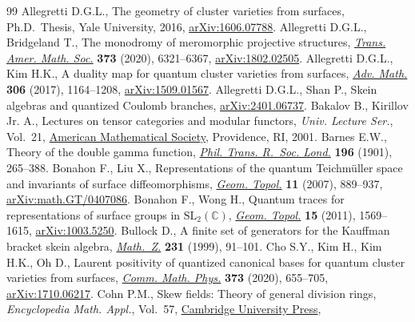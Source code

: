\documentclass[pdftex]{sigma}
\numberwithin{equation}{section}
\theoremstyle{definition}
\begin{document}
\begin{thebibliography}{99}
\footnotesize\itemsep=0pt
Allegretti D.G.L., The geometry of cluster varieties from surfaces, Ph.D.~Thesis, {Y}ale University, 2016,
 \href{http://arxiv.org/abs/1606.07788}{arXiv:1606.07788}.
Allegretti D.G.L., Bridgeland T., The monodromy of meromorphic projective
 structures, \href{https://doi.org/10.1090/tran/8093}{\textit{Trans. Amer.
 Math. Soc.}} \textbf{373} (2020), 6321--6367,
 \href{http://arxiv.org/abs/1802.02505}{arXiv:1802.02505}.
Allegretti D.G.L., Kim H.K., A duality map for quantum cluster varieties from
 surfaces, \href{https://doi.org/10.1016/j.aim.2016.11.007}{\textit{Adv.
 Math.}} \textbf{306} (2017), 1164--1208,
 \href{http://arxiv.org/abs/1509.01567}{arXiv:1509.01567}.
Allegretti D.G.L., Shan P., Skein algebras and quantized Coulomb branches,
 \href{http://arxiv.org/abs/2401.06737}{arXiv:2401.06737}.
Bakalov B., Kirillov Jr. A., Lectures on tensor categories and modular
 functors, \textit{Univ. Lecture Ser.}, Vol.~21,
 \href{https://doi.org/10.1090/ulect/021}{American Mathematical Society},
 Providence, RI, 2001.
Barnes E.W., Theory of the double gamma function,
 \href{https://doi.org/10.1098/rsta.1901.0006}{\textit{Phil. Trans. R.~Soc.
 Lond.}} \textbf{196} (1901), 265--388.
Bonahon F., Liu X., Representations of the quantum {T}eichm\"{u}ller space and
 invariants of surface diffeomorphisms,
 \href{https://doi.org/10.2140/gt.2007.11.889}{\textit{Geom. Topol.}}
 \textbf{11} (2007), 889--937,
 \href{http://arxiv.org/abs/math.GT/0407086}{arXiv:math.GT/0407086}.
Bonahon F., Wong H., Quantum traces for representations of surface groups in
 {$\mathrm{ SL}_2(\mathbb{C})$},
 \href{https://doi.org/10.2140/gt.2011.15.1569}{\textit{Geom. Topol.}}
 \textbf{15} (2011), 1569--1615,
 \href{http://arxiv.org/abs/1003.5250}{arXiv:1003.5250}.
Bullock D., A finite set of generators for the {K}auffman bracket skein
 algebra, \href{https://doi.org/10.1007/PL00004727}{\textit{Math.~Z.}}
 \textbf{231} (1999), 91--101.
Cho S.Y., Kim H., Kim H.K., Oh D., Laurent positivity of quantized canonical
 bases for quantum cluster varieties from surfaces,
 \href{https://doi.org/10.1007/s00220-019-03411-w}{\textit{Comm. Math. Phys.}}
 \textbf{373} (2020), 655--705,
 \href{http://arxiv.org/abs/1710.06217}{arXiv:1710.06217}.
Cohn P.M., Skew fields: {T}heory of general division rings,
 \textit{Encyclopedia Math. Appl.}, Vol.~57,
 \href{https://doi.org/10.1017/CBO9781139087193}{Cambridge University Press},

\end{thebibliography}
\end{document}
